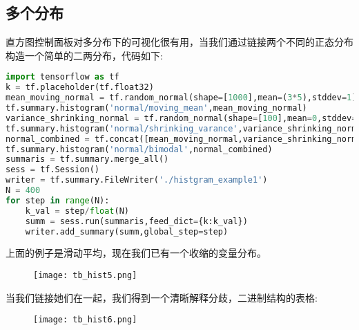 \subsection{多个分布}
直方图控制面板对多分布下的可视化很有用，当我们通过链接两个不同的正态分布构造一个简单的二两分布，代码如下:
\begin{lstlisting}[language=Python]
import tensorflow as tf
k = tf.placeholder(tf.float32)
mean_moving_normal = tf.random_normal(shape=[1000],mean=(3*5),stddev=1)
tf.summary.histogram('normal/moving_mean',mean_moving_normal)
variance_shrinking_normal = tf.random_normal(shape=[100],mean=0,stddev=1-(k))
tf.summary.histogram('normal/shrinking_varance',variance_shrinking_normal)
normal_combined = tf.concat([mean_moving_normal,variance_shrinking_normal],0)
tf.summary.histogram('normal/bimodal',normal_combined)
summaris = tf.summary.merge_all()
sess = tf.Session()
writer = tf.summary.FileWriter('./histgram_example1')
N = 400
for step in range(N):
    k_val = step/float(N)
    summ = sess.run(summaris,feed_dict={k:k_val})
    writer.add_summary(summ,global_step=step)
\end{lstlisting}
上面的例子是滑动平均，现在我们已有一个收缩的变量分布。
\begin{center}
\begin{figure}[H]
\texttt{[image: tb\_hist5.png]}
\end{figure}
\end{center}
当我们链接她们在一起，我们得到一个清晰解释分歧，二进制结构的表格:
\begin{center}
\begin{figure}[H]
\texttt{[image: tb\_hist6.png]}
\end{figure}
\end{center}
